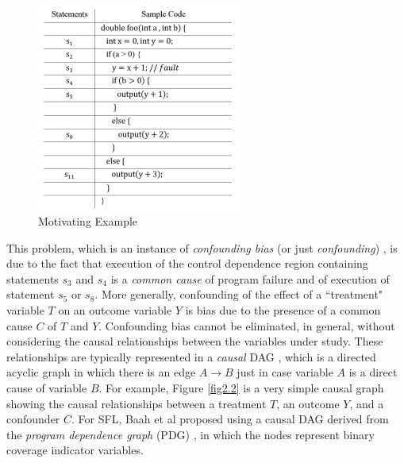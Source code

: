 \begin{figure}[htb!]
\vspace{0em}
\begin{center}
\includegraphics[width=0.6\textwidth]{chapter2_fig1.pdf}
\vspace {0em}\caption{Motivating Example} \label{fig2.1}
\end{center}
\vspace {0em}
\end{figure}

This problem, which is an instance of {\it confounding bias} (or just {\it confounding}) \cite{pearl2000models}, is due to the fact that execution of the control dependence region \cite{ball1993s} containing statements $s_3$ and $s_4$ is a {\it common cause} of program failure and of execution of statement $s_5$ or $s_8$.  More generally, confounding of the effect of a ``treatment" variable $T$ on an outcome variable $Y$ is bias due to the presence of a common cause $C$ of $T$ and $Y$.  Confounding bias cannot be eliminated, in general, without considering the causal relationships between the variables under study.  These relationships are typically represented in a {\it causal} DAG \cite{pearl2000models}, which is a directed acyclic graph in which there is an edge $A \rightarrow B$ just in case variable $A$ is a direct cause of variable $B$.  For example, Figure \ref{fig2.2} is a very simple causal graph showing the causal relationships between a treatment $T$, an outcome $Y$, and a confounder $C$.  For SFL, Baah et al \cite{baah2010causal,baah2011mitigating} proposed using a causal DAG derived from the {\it program dependence graph} (PDG) \cite{ferrante1987program}, in which the nodes represent binary coverage indicator variables.

